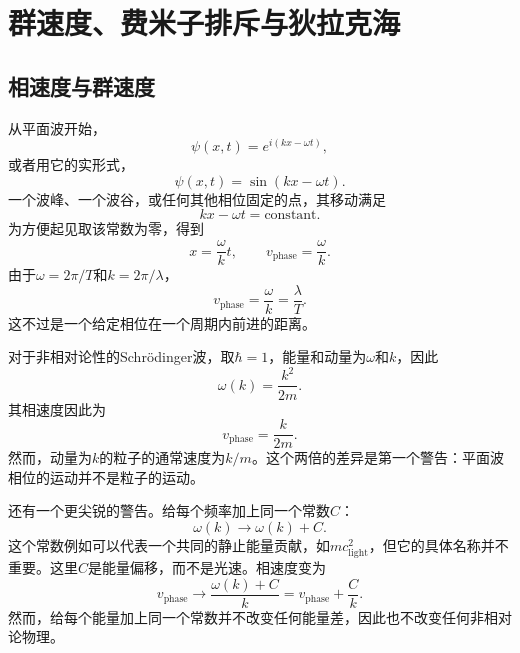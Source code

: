 \chapter{群速度、费米子排斥与狄拉克海}

\section{相速度与群速度}

\begin{classroomqa}
\end{classroomqa}

从平面波开始，
\begin{equation}
\psi(x,t)=e^{i(kx-\omega t)},
\end{equation}
或者用它的实形式，
\begin{equation}
\psi(x,t)=\sin(kx-\omega t).
\end{equation}
一个波峰、一个波谷，或任何其他相位固定的点，其移动满足
\begin{equation}
kx-\omega t=\text{constant}.
\end{equation}
为方便起见取该常数为零，得到
\begin{equation}
x=\frac{\omega}{k}t,
\qquad
v_{\mathrm{phase}}=\frac{\omega}{k}.
\end{equation}
由于\(\omega=2\pi/T\)和\(k=2\pi/\lambda\)，
\begin{equation}
v_{\mathrm{phase}}=\frac{\omega}{k}=\frac{\lambda}{T}.
\end{equation}
这不过是一个给定相位在一个周期内前进的距离。

对于非相对论性的Schr\"odinger波，取\(\hbar=1\)，能量和动量为\(\omega\)和\(k\)，因此
\begin{equation}
\omega(k)=\frac{k^2}{2m}.
\end{equation}
其相速度因此为
\begin{equation}
v_{\mathrm{phase}}=\frac{k}{2m}.
\end{equation}
然而，动量为\(k\)的粒子的通常速度为\(k/m\)。这个两倍的差异是第一个警告：平面波相位的运动并不是粒子的运动。

还有一个更尖锐的警告。给每个频率加上同一个常数\(C\)：
\begin{equation}
\omega(k)\longrightarrow \omega(k)+C.
\end{equation}
这个常数例如可以代表一个共同的静止能量贡献，如\(mc_{\mathrm{light}}^2\)，但它的具体名称并不重要。这里\(C\)是能量偏移，而不是光速。相速度变为
\begin{equation}
v_{\mathrm{phase}}\longrightarrow
\frac{\omega(k)+C}{k}
=v_{\mathrm{phase}}+\frac{C}{k}.
\end{equation}
然而，给每个能量加上同一个常数并不改变任何能量差，因此也不改变任何非相对论物理。

